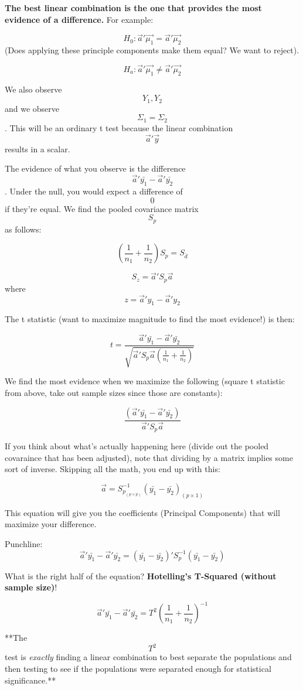 \documentclass[]{article}
\begin{document}
\textbf{The best linear combination is the one that provides the most
evidence of a difference.} For example:

\[H_0: \vec{a}'\vec{\mu_1} = \vec{a}'\vec{\mu_2}\] (Does applying these
principle components make them equal? We want to reject).

\[H_a: \vec{a}'\vec{\mu_1} \ne \vec{a}'\vec{\mu_2}\]

We also observe \[Y_1, Y_2\] and we observe \[\Sigma_1 = \Sigma_2\].
This will be an ordinary t test because the linear combination
\[\vec{a}'\vec{y}\] results in a scalar.

The evidence of what you observe is the difference
\[\vec{a}'\bar{y_1} - \vec{a}'\bar{y_2}\]. Under the null, you would
expect a difference of \[0\] if they're equal. We find the pooled
covariance matrix \[S_p\] as follows:

\[(\frac{1}{n_1} + \frac{1}{n_2})S_p = S_\bar{d}\]

\[S_z = \vec{a}'S_p\vec{a}\] where \[z = \vec{a}'y_1 - \vec{a}'y_2\]

The t statistic (want to maximize magnitude to find the most evidence!)
is then:

\[t = \frac{\vec{a}'\bar{y_1} - \vec{a}'\bar{y_2}}{\sqrt{\vec{a}'S_p\vec{a}(\frac{1}{n_1} + \frac{1}{n_2})}}\]

We find the most evidence when we maximize the following (square t
statistic from above, take out sample sizes since those are constants):

\[\frac{(\vec{a}'\bar{y_1} - \vec{a}'\bar{y_2})}{\vec{a}'S_p\vec{a}}\]

If you think about what's actually happening here (divide out the pooled
covaraince that has been adjusted), note that dividing by a matrix
implies some sort of inverse. Skipping all the math, you end up with
this:

\[\vec{a} = S_{p_{(p \times p)}}^{-1}(\bar{y_1} - \bar{y_2})_{(p \times 1)}\]

This equation will give you the coefficients (Principal Components) that
will maximize your difference.

Punchline:
\[\vec{a}'\bar{y_1} - \vec{a}'\bar{y_2} = (\bar{y_1} - \bar{y_2})'S_p^{-1}(\bar{y_1} - \bar{y_2})\]

What is the right half of the equation? \textbf{Hotelling's T-Squared
(without sample size)}!

\[\vec{a}'\bar{y_1} - \vec{a}'\bar{y_2} = T^2(\frac{1}{n_1} + \frac{1}{n_2})^{-1}\]

**The \[T^2\] test is \emph{exactly} finding a linear combination to
best separate the populations and then testing to see if the populations
were separated enough for statistical significance.**
\end{document}
